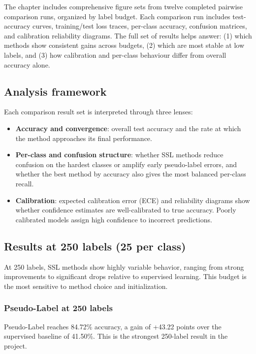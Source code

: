 The chapter includes comprehensive figure sets from twelve completed pairwise comparison runs, organized by label budget. Each comparison run includes test-accuracy curves, training/test loss traces, per-class accuracy, confusion matrices, and calibration reliability diagrams. The full set of results helps answer: (1) which methods show consistent gains across budgets, (2) which are most stable at low labels, and (3) how calibration and per-class behaviour differ from overall accuracy alone.

\subsection{Analysis framework}

Each comparison result set is interpreted through three lenses:

\begin{itemize}
    \item \textbf{Accuracy and convergence}: overall test accuracy and the rate at which the method approaches its final performance.
    \item \textbf{Per-class and confusion structure}: whether SSL methods reduce confusion on the hardest classes or amplify early pseudo-label errors, and whether the best method by accuracy also gives the most balanced per-class recall.
    \item \textbf{Calibration}: expected calibration error (ECE) and reliability diagrams show whether confidence estimates are well-calibrated to true accuracy. Poorly calibrated models assign high confidence to incorrect predictions.
\end{itemize}

\subsection{Results at 250 labels (25 per class)}

At 250 labels, SSL methods show highly variable behavior, ranging from strong improvements to significant drops relative to supervised learning. This budget is the most sensitive to method choice and initialization.

\subsubsection{Pseudo-Label at 250 labels}

Pseudo-Label reaches 84.72\% accuracy, a gain of +43.22 points over the supervised baseline of 41.50\%. This is the strongest 250-label result in the project.

